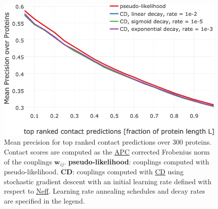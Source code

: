\documentclass[11pt,a4paper,twoside]{book}
\newcommand{\wij}{\mathbf{w}_{ij}}
\theoremstyle{definition}
\theoremstyle{definition}
\theoremstyle{remark}
\begin{document}
\begin{figure}

{\centering \includegraphics[width=0.9\linewidth]{img/full_likelihood/sgd/precision_vs_rank_schedules} 

}

\caption{Mean precision for
top ranked contact predictions over 300 proteins. Contact scores are
computed as the \protect\hyperlink{abbrev}{APC} corrected Frobenius norm
of the couplings \(\wij\). \textbf{pseudo-likelihood}: couplings
computed with pseudo-likelihood. \textbf{CD}: couplings computed with
\protect\hyperlink{abbrev}{CD} using stochastic gradient descent with an
initial learning rate defined with respect to
\protect\hyperlink{abbrev}{Neff}. Learning rate annealing schedules and
decay rates are specified in the legend.}\label{fig:performance-cd-learnignrate-schedules}
\end{figure}
\end{document}
